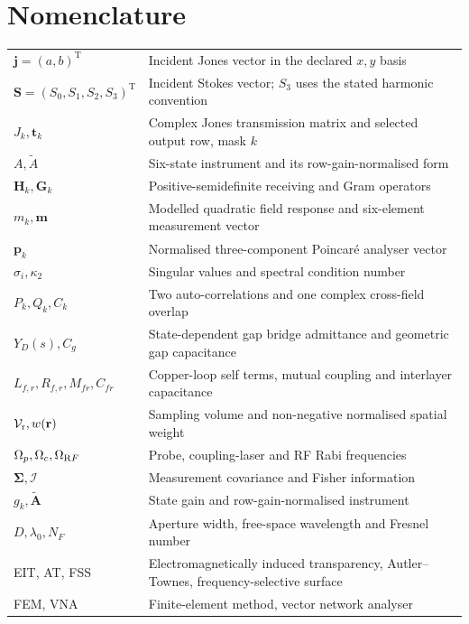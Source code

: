 \documentclass{ieeeaccess}
\begin{document}
\section*{Nomenclature}
\small\noindent\begin{tabularx}{\columnwidth}{@{}lX@{}}
$\boldsymbol j=(a,b)^\mathrm T$ & Incident Jones vector in the declared $x,y$ basis\\
$\boldsymbol S=(S_0,S_1,S_2,S_3)^\mathrm T$ & Incident Stokes vector; $S_3$ uses the stated harmonic convention\\
$J_k,\boldsymbol t_k$ & Complex Jones transmission matrix and selected output row, mask $k$\\
$A,\widetilde A$ & Six-state instrument and its row-gain-normalised form\\
$\mathbf H_k,\mathbf G_k$ & Positive-semidefinite receiving and Gram operators\\
$m_k,\boldsymbol m$ & Modelled quadratic field response and six-element measurement vector\\
$\boldsymbol p_k$ & Normalised three-component Poincar\'e analyser vector\\
$\sigma_i,\kappa_2$ & Singular values and spectral condition number\\
$P_k,Q_k,C_k$ & Two auto-correlations and one complex cross-field overlap\\
$Y_D(s),C_g$ & State-dependent gap bridge admittance and geometric gap capacitance\\
$L_{f,r},R_{f,r},M_{fr},C_{fr}$ & Copper-loop self terms, mutual coupling and interlayer capacitance\\
$\mathcal V_{\rm r},w(\mathbf r)$ & Sampling volume and non-negative normalised spatial weight\\
$\Omega_p,\Omega_c,\Omega_{\rm RF}$ & Probe, coupling-laser and RF Rabi frequencies\\
$\boldsymbol\Sigma,\mathcal I$ & Measurement covariance and Fisher information\\
$g_k,\widetilde{\boldsymbol A}$ & State gain and row-gain-normalised instrument\\
$D,\lambda_0,N_F$ & Aperture width, free-space wavelength and Fresnel number\\
EIT, AT, FSS & Electromagnetically induced transparency, Autler--Townes, frequency-selective surface\\
FEM, VNA & Finite-element method, vector network analyser\\
\end{tabularx}\normalsize
\end{document}
